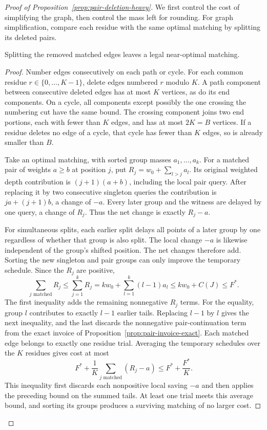 \begin{proof}[Proof of Proposition~\ref{prop:pair-deletion-heavy}]
We first control the cost of simplifying the graph, then control
the mass left for rounding. For graph simplification, compare each
residue with the same optimal matching by splitting its deleted pairs.

\begin{claim}
\label{clm:pair-residue-loss}
Splitting the removed matched edges leaves a legal near-optimal matching.
\end{claim}
\begin{proof}
Number edges consecutively on each path or cycle. For each common
residue $r\in\{0,\ldots,K-1\}$, delete edges numbered $r$ modulo
$K$. A path component between consecutive deleted edges has at most
$K$ vertices, as do its end components. On a cycle, all components
except possibly the one crossing the numbering cut have the same
bound. The crossing component joins two end portions, each with fewer
than $K$ edges, and has at most $2K=B$ vertices. If a residue deletes
no edge of a cycle, that cycle has fewer than $K$ edges, so is already
smaller than $B$.

Take an optimal matching, with sorted group masses
$a_1,\ldots,a_k$. For a matched pair of weights $a\ge b$ at
position $j$, put $R_j=w_0+\sum_{l>j}a_l$. Its original weighted
depth contribution is $(j+1)(a+b)$, including the local pair query.
After replacing it by two consecutive singleton queries the contribution
is $ja+(j+1)b$, a change of $-a$. Every later group and the
witness are delayed by one query, a change of $R_j$. Thus the
net change is exactly $R_j-a$.

For simultaneous splits, each earlier split delays all points of a
later group by one regardless of whether that group is also split.
The local change $-a$ is likewise independent of the group's shifted
position. The net changes therefore add. Sorting the new singleton
and pair groups can only improve the temporary schedule. Since the
$R_j$ are positive,
\[
 \sum_{j\text{ matched}}R_j
 \le\sum_{j=1}^k R_j
 =kw_0+\sum_{l=1}^k(l-1)a_l
 \le kw_0+C(J)\le F^*.
\]
The first inequality adds the remaining nonnegative $R_j$ terms.
For the equality, group $l$ contributes to exactly $l-1$ earlier
tails. Replacing $l-1$ by $l$ gives the next inequality, and the
last discards the nonnegative pair-continuation term from the exact
invoice of Proposition~\ref{prop:pair-invoice-exact}.
Each matched edge belongs to exactly one residue trial. Averaging
the temporary schedules over the $K$ residues gives cost at most
\[
 F^*+\frac1K\sum_{j\text{ matched}}(R_j-a)
 \le F^*+\frac{F^*}{K}.
\]
This inequality first discards each nonpositive local saving $-a$
and then applies the preceding bound on the summed tails.
At least one trial meets this average bound, and sorting its groups
produces a surviving matching of no larger cost.


\end{proof}
\end{proof}
